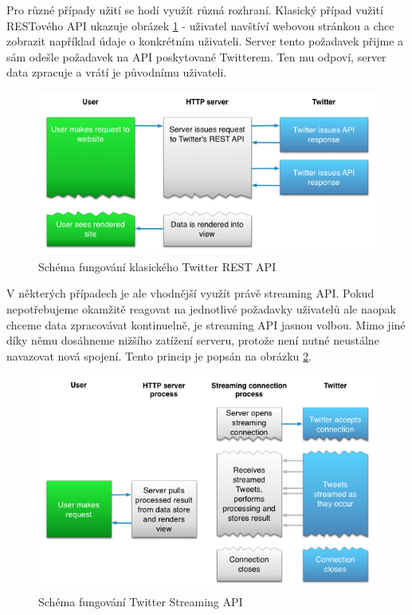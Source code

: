 \documentclass[thesis=B,czech]{FITthesis}[2012/06/26]
\begin{document}
	Pro různé případy užití se hodí využít různá rozhraní. Klasický případ vužití RESTového API ukazuje obrázek \ref{fig:twitter_rest} - uživatel navštíví webovou stránkou a chce zobrazit například údaje o konkrétním uživateli. Server tento požadavek přijme a sám odešle požadavek na API poskytované Twitterem. Ten mu odpoví, server data zpracuje a vrátí je původnímu uživateli. 

\begin{figure}[ht]
   	\centering
   	\includegraphics[width=1\textwidth]{images/twitter-rest.png}
   	\caption{Schéma fungování klasického Twitter REST API\cite{twitter-rest-stream}}
   	\label{fig:twitter_rest}
\end{figure}

	V některých případech je ale vhodnější využít právě streaming API. Pokud nepotřebujeme okamžitě reagovat na jednotlivé požadavky uživatelů ale naopak chceme data zpracovávat kontinuelně, je streaming API jasnou volbou. Mimo jiné díky němu dosáhneme nižšího zatížení serveru, protože není nutné neustálne navazovat nová spojení. Tento princip je popsán na obrázku \ref{fig:twitter_streaming}. 

\begin{figure}[ht]
   	\centering
   	\includegraphics[width=1\textwidth]{images/twitter-streaming.png}
   	\caption{Schéma fungování Twitter Streaming API\cite{twitter-rest-stream}}
   	\label{fig:twitter_streaming}
\end{figure}
\end{document}
